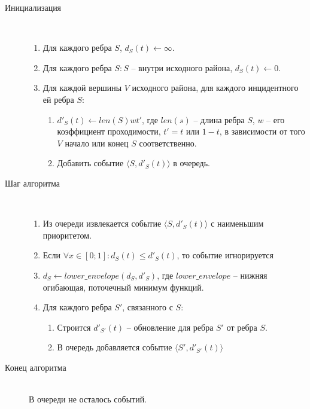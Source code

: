 \begin{description}
\item[Инициализация]\hfill \\
\begin{enumerate}
\item Для каждого ребра $S$, $d_S(t) \gets \infty$.
\item Для каждого ребра $S: S$ -- внутри исходного района, $d_S(t) \gets 0$.
\item Для каждой вершины $V$ исходного района, для каждого инцидентного ей
ребра $S$:
  \begin{enumerate}
  \item $d'_S(t) \gets len(S)wt'$, где $len(s)$ -- длина ребра $S$,
    $w$ -- его коэффициент проходимости, $t' = t$ или $1 - t$, в зависимости от
    того $V$ начало или конец $S$ соответственно.
  \item Добавить событие $\langle S, d'_S(t) \rangle$ в очередь.
  \end{enumerate}
\end{enumerate}

\item[Шаг алгоритма]\hfill \\
\begin{enumerate}
\item Из очереди извлекается событие $\langle S, d'_S(t) \rangle$ с наименьшим приоритетом.
\item Если $\forall x \in [0; 1]: d_S(t) \leq d'_S(t)$, то событие игнорируется
\item $d_S \gets lower\_envelope(d_S, d'_S)$, где $lower\_envelope$ --
нижняя огибающая, поточечный минимум функций.
\item Для каждого ребра $S'$, связанного с $S$:
  \begin{enumerate}
  \item Строится $d'_{S'}(t)$ -- обновление для ребра $S'$ от ребра $S$.
  \item В очередь добавляется событие $\langle S', d'_{S'}(t) \rangle$
  \end{enumerate}
\end{enumerate}

\item[Конец алгоритма]\hfill \\
В очереди не осталось событий.
\end{description}

\FloatBarrier

